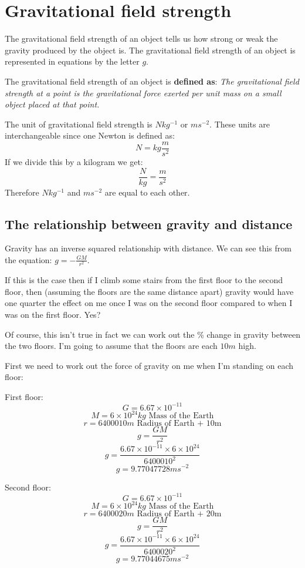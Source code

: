 \documentclass{article}
\begin{document}
\section*{Gravitational field strength}
The gravitational field strength of an object tells us how strong or weak the
gravity produced by the object is. The gravitational field strength of an object
is represented in equations by the letter $g$.

The gravitational field strength of an object is \textbf{defined as}:
\textit{The gravitational field strength at a point is the gravitational force
exerted per unit mass on a small object placed at that point.}

The unit of gravitational field strength is $Nkg^{-1}$ or $ms^{-2}$. These units
are interchangeable since one Newton is defined as:
\[
	N = kg \frac{m}{s^2}
\] 
If we divide this by a kilogram we get:
\[
	\frac{N}{kg} = \frac{m}{s^2}
\]
Therefore $Nkg^{-1}$ and $ms^{-2}$ are equal to each other.


\subsection*{The relationship between gravity and distance}
Gravity has an inverse squared relationship with distance. We can see this from
the equation: $g = -\frac{GM}{r^2}$. 

If this is the case then if I climb some stairs from the first floor to the
second floor, then (assuming the floors are the same distance apart) gravity
would have one quarter the effect on me once I was on the second floor compared
to when I was on the first floor. Yes?

Of course, this isn't true in fact we can work out the \% change in gravity
between the two floors. I'm going to assume that the floors are each $10m$ high.

First we need to work out the force of gravity on me when I'm standing on each
floor:

\begin{minipage}[t]{0.5\textwidth}
First floor:
\[
	G = 6.67 \times 10^{-11}
\]
\[
	M = 6 \times 10^{24}kg \textrm{ Mass of the Earth}
\]
\[
	r = 6400010m \textrm{ Radius of Earth + 10m}
\]
\[
	g = \frac{GM}{r^2}
\]
\[
	g = \frac{6.67 \times 10^{-11} \times 6 × 10^{24}}{6400010^2}
\]
\[
	g = 9.77047728ms^{-2}
\]
\end{minipage}
\begin{minipage}[t]{0.5\textwidth}
Second floor:
\[
	G = 6.67 \times 10^{-11}
\]
\[
	M = 6 \times 10^{24}kg \textrm{ Mass of the Earth}
\]
\[
	r = 6400020m \textrm{ Radius of Earth + 20m}
\]
\[
	g = \frac{GM}{r^2}
\]
\[
	g = \frac{6.67 \times 10^{-11} \times 6 \times 10^{24}}{6400020^2}
\]
\[
	g = 9.77044675ms^{-2}
\]
\end{minipage}\\
\end{document}
